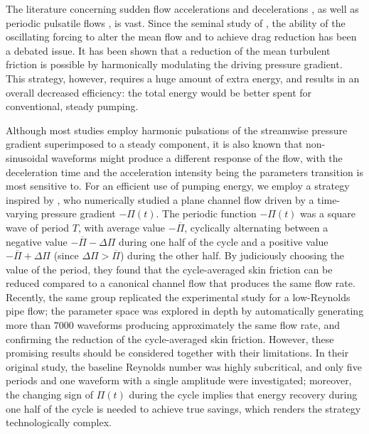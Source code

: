 \documentclass[lineno]{jfm}
\begin{document}
The literature concerning sudden flow accelerations and decelerations \citep{mathur-etal-2018}, as well as periodic pulsatile flows \citep{xu-song-avila-2021}, is vast. Since the seminal study of \citet{tu-ramaprian-1983}, the ability of the oscillating forcing to alter the mean flow and to achieve drag reduction has been a debated issue.
It has been shown \citep[see for example][]{manna-vacca-verzicco-2015} that a reduction of the mean turbulent friction is possible by harmonically modulating the driving pressure gradient. 
This strategy, however, requires a huge amount of extra energy, and results in an overall decreased efficiency: the total energy would be better spent for conventional, steady pumping.
 
Although most studies employ harmonic pulsations of the streamwise pressure gradient 
superimposed to a steady component, it is also known that non-sinusoidal waveforms
\citep{brindise-vlachos-2018, ciofalo-2022} might produce a different response of the flow, with the deceleration time and the acceleration intensity being the parameters 
transition is most sensitive to. 
For an efficient use of pumping energy, we employ a strategy 
inspired by \cite{iwamoto-sasou-kawamura-2007}, who numerically studied 
a plane channel flow \citep[an experimental followup was presented by][for a pipe flow]{souma-iwamoto-murata-2009} driven by a time-varying pressure gradient $-\Pi(t)$. The periodic function $-\Pi(t)$ was a square wave of period $T$, with average value $-\overline{\Pi}$, cyclically alternating between a negative value $-\overline{\Pi} - \Delta \Pi$ during one half of the cycle and a positive value $-\overline{\Pi} + \Delta \Pi$ (since $\Delta \Pi > \overline{\Pi}$) during the other half.
By judiciously choosing the value of the period, they found that the cycle-averaged 
skin friction can be reduced compared to a canonical channel flow 
that produces the same flow rate. 
Recently, the same group \citep{kobayashi-etal-2021} replicated the experimental 
study for a low-Reynolds pipe flow; the parameter space was explored in depth 
by automatically generating more than $7000$  waveforms producing approximately the same flow rate, and confirming the reduction of the cycle-averaged skin friction.
However, these promising results should be considered together with their limitations. In their original study, the baseline Reynolds number was highly subcritical, and only five periods and one waveform with a single amplitude were investigated; moreover, the changing sign of $\Pi(t)$ during the cycle implies that energy recovery during one half of the cycle is needed to achieve true savings, which renders the strategy technologically complex. 
\end{document}
